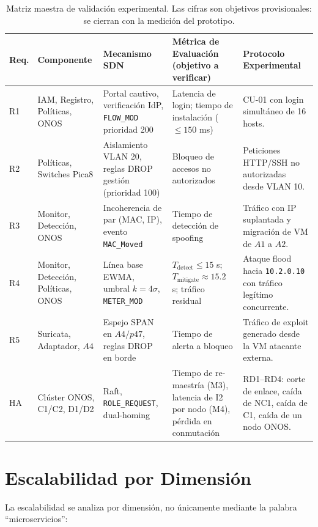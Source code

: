 \documentclass[11pt,a4paper]{report}
\begin{document}
\begin{table}[h!]
\centering
\small
\begin{tabularx}{\linewidth}{p{0.8cm}p{2.6cm}p{3.2cm}p{3.2cm}X}
\toprule
\textbf{Req.} & \textbf{Componente} & \textbf{Mecanismo SDN} & \textbf{Métrica de Evaluación (objetivo a verificar)} & \textbf{Protocolo Experimental} \\
\midrule
R1 & IAM, Registro, Políticas, ONOS & Portal cautivo, verificación IdP, \texttt{FLOW\_MOD} prioridad 200 & Latencia de login; tiempo de instalación ($\le 150$ ms) & CU-01 con login simultáneo de 16 hosts. \\
R2 & Políticas, Switches Pica8 & Aislamiento VLAN 20, reglas DROP gestión (prioridad 100) & Bloqueo de accesos no autorizados & Peticiones HTTP/SSH no autorizadas desde VLAN 10. \\
R3 & Monitor, Detección, ONOS & Incoherencia de par (MAC, IP), evento \texttt{MAC\_Moved} & Tiempo de detección de spoofing & Tráfico con IP suplantada y migración de VM de $A1$ a $A2$. \\
R4 & Monitor, Detección, Políticas, ONOS & Línea base EWMA, umbral $k=4\sigma$, \texttt{METER\_MOD} & $T_{\text{detect}} \le 15$ s; $T_{\text{mitigate}} \approx 15.2$ s; tráfico residual & Ataque flood hacia \texttt{10.2.0.10} con tráfico legítimo concurrente. \\
R5 & Suricata, Adaptador, $A4$ & Espejo SPAN en $A4/p47$, reglas DROP en borde & Tiempo de alerta a bloqueo & Tráfico de exploit generado desde la VM atacante externa. \\
HA & Clúster ONOS, C1/C2, D1/D2 & Raft, \texttt{ROLE\_REQUEST}, dual-homing & Tiempo de re-maestría (M3), latencia de I2 por nodo (M4), pérdida en conmutación & RD1--RD4: corte de enlace, caída de NC1, caída de C1, caída de un nodo ONOS. \\
\bottomrule
\end{tabularx}
\caption{Matriz maestra de validación experimental. Las cifras son objetivos provisionales: se cierran con la medición del prototipo.}
\label{tab:maestra}
\end{table}

\section{Escalabilidad por Dimensión}
La escalabilidad se analiza por dimensión, no únicamente mediante la palabra ``microservicios'':
\end{document}
